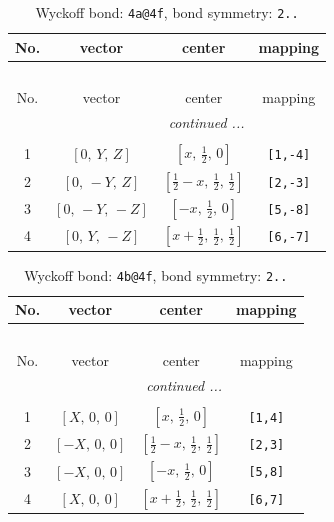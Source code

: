 \documentclass[fleqn,8pt]{jsarticle}
\begin{document}
\begin{longtable}{cccc}
\caption{Wyckoff bond: {\tt 4a@4f}, bond symmetry: {\tt 2..}}
 \\
 \hline \hline
No. & vector & center & mapping \\ \hline \endfirsthead

\multicolumn{3}{l}{\tablename\ \thetable{}} \\
 \hline \hline
No. & vector & center & mapping \\ \hline \endhead

 \hline \hline
\multicolumn{3}{r}{\footnotesize\it continued ...} \\ \endfoot

 \hline \hline
\multicolumn{3}{r}{} \\ \endlastfoot

1 & $\left[ 0,\, Y,\, Z \right]$ & $\left[ x,\, \frac{1}{2},\, 0 \right]$ & {\tt [1,-4]} \\ \hline
2 & $\left[ 0,\, - Y,\, Z \right]$ & $\left[ \frac{1}{2} - x,\, \frac{1}{2},\, \frac{1}{2} \right]$ & {\tt [2,-3]} \\ \hline
3 & $\left[ 0,\, - Y,\, - Z \right]$ & $\left[ - x,\, \frac{1}{2},\, 0 \right]$ & {\tt [5,-8]} \\ \hline
4 & $\left[ 0,\, Y,\, - Z \right]$ & $\left[ x + \frac{1}{2},\, \frac{1}{2},\, \frac{1}{2} \right]$ & {\tt [6,-7]} \\
\end{longtable}
\renewcommand{\arraystretch}{1.2}
\begin{longtable}{cccc}
\caption{Wyckoff bond: {\tt 4b@4f}, bond symmetry: {\tt 2..}}
 \\
 \hline \hline
No. & vector & center & mapping \\ \hline \endfirsthead

\multicolumn{3}{l}{\tablename\ \thetable{}} \\
 \hline \hline
No. & vector & center & mapping \\ \hline \endhead

 \hline \hline
\multicolumn{3}{r}{\footnotesize\it continued ...} \\ \endfoot

 \hline \hline
\multicolumn{3}{r}{} \\ \endlastfoot

1 & $\left[ X,\, 0,\, 0 \right]$ & $\left[ x,\, \frac{1}{2},\, 0 \right]$ & {\tt [1,4]} \\ \hline
2 & $\left[ - X,\, 0,\, 0 \right]$ & $\left[ \frac{1}{2} - x,\, \frac{1}{2},\, \frac{1}{2} \right]$ & {\tt [2,3]} \\ \hline
3 & $\left[ - X,\, 0,\, 0 \right]$ & $\left[ - x,\, \frac{1}{2},\, 0 \right]$ & {\tt [5,8]} \\ \hline
4 & $\left[ X,\, 0,\, 0 \right]$ & $\left[ x + \frac{1}{2},\, \frac{1}{2},\, \frac{1}{2} \right]$ & {\tt [6,7]} \\
\end{longtable}
\end{document}
